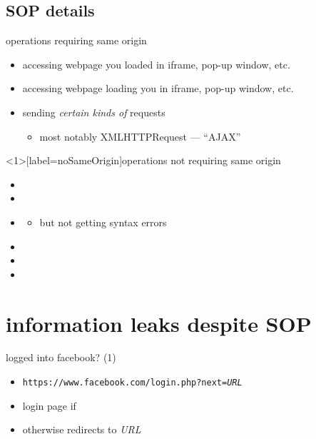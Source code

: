 \subsection{SOP details}

\begin{frame}{operations requiring same origin}
    \begin{itemize}
    \item accessing webpage you loaded in iframe, pop-up window, etc.
    \item accessing webpage loading you in iframe, pop-up window, etc.
    \item sending \textit{certain kinds of} requests
        \begin{itemize}
        \item most notably XMLHTTPRequest --- ``AJAX''
        \end{itemize}
    \end{itemize}
\end{frame}

\begin{frame}<1>[label=noSameOrigin]{operations not requiring same origin}
    \begin{itemize}
    \item {}
    \item {}
    \item {}
        \begin{itemize}
        \item but not getting syntax errors
        \end{itemize}
    \item {}
    \item {}
    \item {}
    \end{itemize}
\end{frame}


\section{information leaks despite SOP}


\begin{frame}[fragile,label=inFB]{logged into facebook? (1)}
    \begin{itemize}
        \item \texttt{https://www.facebook.com/login.php?next=\textit{URL}}
        \item login page if 
            \item otherwise redirects to \textit{URL}
    \end{itemize}
\end{frame}

